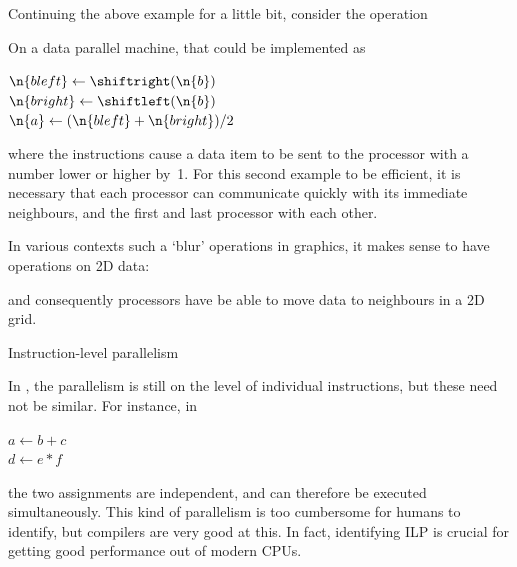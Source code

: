 Continuing the above example for a little bit, consider the operation

\begin{displayalgorithm}
\end{displayalgorithm}

On a data parallel machine, that could be implemented as

\begin{displayalgorithm}
  $\n{bleft} \leftarrow \shiftright(\n{b})$\\
  $\n{bright} \leftarrow \shiftleft(\n{b})$\\
  $\n{a} \leftarrow (\n{bleft}+\n{bright})/2$
\end{displayalgorithm}

where the  instructions cause a data item to be
sent to the processor with a number lower or higher by~1.
%
For this second example to be efficient, it is necessary that each
processor can communicate quickly with its immediate neighbours, and
the first and last processor with each other. 

In
various contexts such a `blur' operations in graphics, it makes sense
to have operations on 2D data:

\begin{displayalgorithm}
\end{displayalgorithm}

and consequently processors have be able to move data to neighbours in
a 2D grid.

 {Instruction-level parallelism}

In , the parallelism is still on the level of individual
instructions, but these need not be similar. For instance, in 

\begin{displayalgorithm}
  $a\leftarrow b+c$\\ $d\leftarrow e*f$
\end{displayalgorithm}

the two assignments are independent, and can therefore be executed
simultaneously. This kind of parallelism is too cumbersome for humans
to identify, but compilers are very good at this. In
fact, identifying \ac{ILP} is crucial for getting good performance out
of modern  CPUs.

